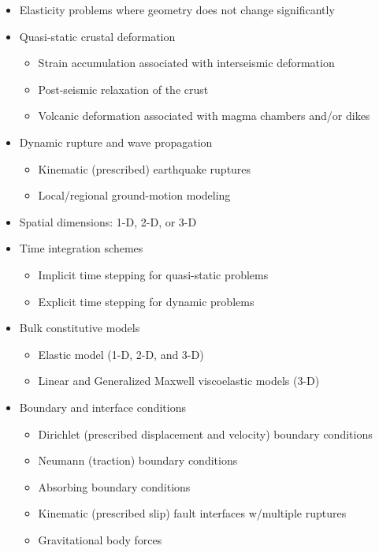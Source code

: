 \documentclass[pdftex,cig,slideColor]{pp4slides}
\begin{document}

  \begin{itemize}
  \item Elasticity problems where geometry does not change significantly
  \item Quasi-static crustal deformation
    \begin{itemize}
    \item Strain accumulation associated with interseismic deformation
    \item Post-seismic relaxation of the crust
    \item Volcanic deformation associated with magma chambers and/or dikes
    \end{itemize}
  \item Dynamic rupture and wave propagation
    \begin{itemize}
    \item Kinematic (prescribed) earthquake ruptures
    \item Local/regional ground-motion modeling
    \end{itemize}
  \end{itemize}

  \summary{}

  \begin{itemize}
  \item Spatial dimensions: 1-D, 2-D, or 3-D
  \item Time integration schemes
    \begin{itemize}
    \item Implicit time stepping for quasi-static problems
    \item Explicit time stepping for dynamic problems
    \end{itemize}
  \item Bulk constitutive models
    \begin{itemize}
    \item Elastic model (1-D, 2-D, and 3-D)
    \item Linear and Generalized Maxwell viscoelastic models (3-D)
    \end{itemize}
  \item Boundary and interface conditions
    \begin{itemize}
    \item Dirichlet (prescribed displacement and velocity) boundary conditions
    \item Neumann (traction) boundary conditions
    \item Absorbing boundary conditions
    \item Kinematic (prescribed slip) fault interfaces w/multiple ruptures
    \item Gravitational body forces
    \end{itemize}
  \end{itemize}
\end{document}
